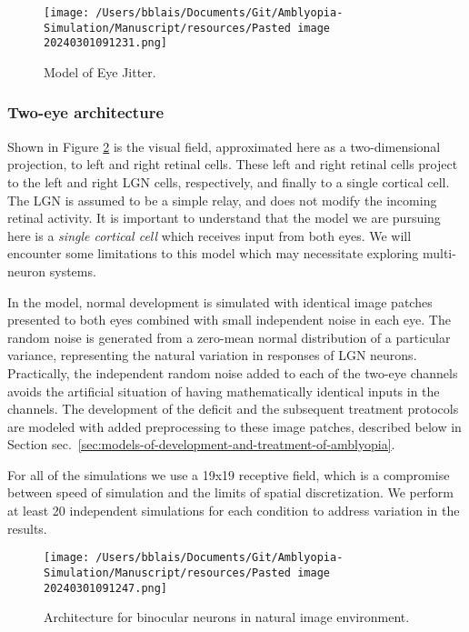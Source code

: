\documentclass[
]{article}
\begin{document}
\begin{figure}
\centering
\texttt{[image: /Users/bblais/Documents/Git/Amblyopia-Simulation/Manuscript/resources/Pasted image 20240301091231.png]}
\caption{Model of Eye Jitter.}\label{fig:eye_jitter}
\end{figure}

\subsubsection{Two-eye architecture}\label{sec:two-eye-architecture}

Shown in Figure \ref{fig:arch} is the visual field, approximated here as
a two-dimensional projection, to left and right retinal cells. These
left and right retinal cells project to the left and right LGN cells,
respectively, and finally to a single cortical cell. The LGN is assumed
to be a simple relay, and does not modify the incoming retinal activity.
It is important to understand that the model we are pursuing here is a
\emph{single cortical cell} which receives input from both eyes. We will
encounter some limitations to this model which may necessitate exploring
multi-neuron systems.

In the model, normal development is simulated with identical image
patches presented to both eyes combined with small independent noise in
each eye. The random noise is generated from a zero-mean normal
distribution of a particular variance, representing the natural
variation in responses of LGN neurons. Practically, the independent
random noise added to each of the two-eye channels avoids the artificial
situation of having mathematically identical inputs in the channels. The
development of the deficit and the subsequent treatment protocols are
modeled with added preprocessing to these image patches, described below
in Section
sec.~\ref{sec:models-of-development-and-treatment-of-amblyopia}.

For all of the simulations we use a 19x19 receptive field, which is a
compromise between speed of simulation and the limits of spatial
discretization. We perform at least 20 independent simulations for each
condition to address variation in the results.

\begin{figure}
\centering
\texttt{[image: /Users/bblais/Documents/Git/Amblyopia-Simulation/Manuscript/resources/Pasted image 20240301091247.png]}
\caption{Architecture for binocular neurons in natural image
environment.}\label{fig:arch}
\end{figure}
\end{document}
